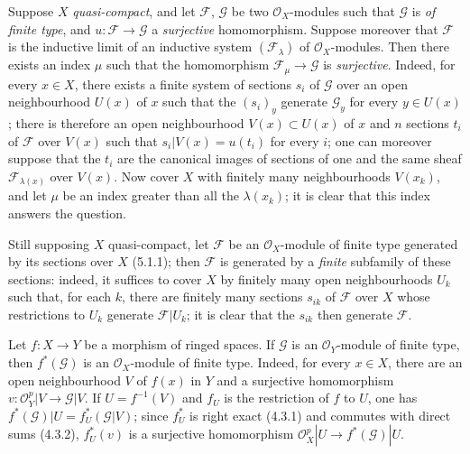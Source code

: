 \begin{env}[5.2.3]
\label{0.5.2.3}
Suppose $X$ \emph{quasi-compact}, and let $\mathcal{F}$, $\mathcal{G}$ be two
$\mathcal{O}_X$-modules such that $\mathcal{G}$ is \emph{of finite type},
and $u:\mathcal{F}\to\mathcal{G}$ a \emph{surjective} homomorphism. Suppose
moreover that $\mathcal{F}$ is the inductive limit of an inductive system
$(\mathcal{F}_\lambda)$ of $\mathcal{O}_X$-modules. Then there exists an index
$\mu$ such that the homomorphism $\mathcal{F}_\mu\to\mathcal{G}$ is
\emph{surjective}. Indeed, for every $x\in X$, there exists a finite system of
sections $s_i$ of $\mathcal{G}$ over an open neighbourhood $U(x)$ of $x$
such that the $(s_i)_y$ generate $\mathcal{G}_y$ for every $y\in U(x)$; there is
therefore an open neighbourhood $V(x)\subset U(x)$ of $x$ and $n$ sections $t_i$ of
$\mathcal{F}$ over $V(x)$ such that
$s_i|V(x)=u(t_i)$ for every $i$; one can moreover suppose that the $t_i$ are
the canonical images of sections of one and the same sheaf
$\mathcal{F}_{\lambda(x)}$ over $V(x)$. Now cover $X$ with
finitely many neighbourhoods $V(x_k)$, and let $\mu$ be an index greater than all
the $\lambda(x_k)$; it is clear that this index answers the question.

Still supposing $X$ quasi-compact, let $\mathcal{F}$ be an
$\mathcal{O}_X$-module of finite type generated by its sections over $X$
(5.1.1); then $\mathcal{F}$ is generated by a \emph{finite} subfamily
of these sections: indeed, it suffices to cover $X$ by finitely many
open neighbourhoods $U_k$ such that, for each $k$, there are finitely many
sections $s_{ik}$ of $\mathcal{F}$ over $X$ whose restrictions to
$U_k$ generate $\mathcal{F}|U_k$; it is clear that the $s_{ik}$ then generate
$\mathcal{F}$.
\end{env}

\begin{env}[5.2.4]
\label{0.5.2.4}
Let $f:X\to Y$ be a morphism of ringed spaces. If $\mathcal{G}$ is an
$\mathcal{O}_Y$-module of finite type, then $f^*(\mathcal{G})$ is an
$\mathcal{O}_X$-module of finite type. Indeed, for every $x\in X$, there are an
open neighbourhood $V$ of $f(x)$ in $Y$ and a surjective homomorphism
$v:\mathcal{O}_Y^p|V\to\mathcal{G}|V$. If $U=f^{-1}(V)$ and $f_U$ is the
restriction of $f$ to $U$, one has
$f^*(\mathcal{G})|U=f_U^*(\mathcal{G}|V)$; since $f_U^*$ is right exact
(4.3.1) and commutes with direct sums (4.3.2), $f_U^*(v)$ is a
surjective homomorphism
$\mathcal{O}_X^p|U\to f^*(\mathcal{G})|U$.
\end{env}

